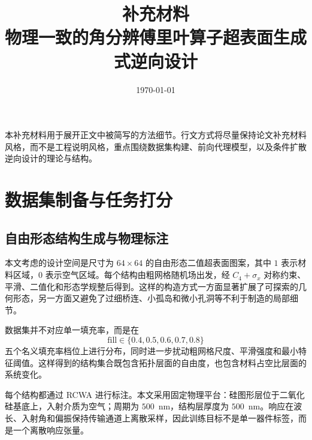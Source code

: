 \documentclass[10pt,a4paper]{article}
\begin{document}
\title{补充材料\\[0.4em]\large 物理一致的角分辨傅里叶算子超表面生成式逆向设计}
\author{}
\date{\today}
\maketitle

本补充材料用于展开正文中被简写的方法细节。行文方式将尽量保持论文补充材料风格，而不是工程说明风格，重点围绕数据集构建、前向代理模型，以及条件扩散逆向设计的理论与结构。

\section{数据集制备与任务打分}

\subsection{自由形态结构生成与物理标注}

本文考虑的设计空间是尺寸为 $64\times64$ 的自由形态二值超表面图案，其中 $1$ 表示材料区域，$0$ 表示空气区域。每个结构由粗网格随机场出发，经 $C_4+\sigma_x$ 对称约束、平滑、二值化和形态学规整后得到。这样的构造方式一方面显著扩展了可探索的几何形态，另一方面又避免了过细桥连、小孤岛和微小孔洞等不利于制造的局部细节。

数据集并不对应单一填充率，而是在
\begin{equation}
\mathrm{fill}\in\{0.4,0.5,0.6,0.7,0.8\}
\end{equation}
五个名义填充率档位上进行分布，同时进一步扰动粗网格尺度、平滑强度和最小特征阈值。这样得到的结构集合既包含拓扑层面的自由度，也包含材料占空比层面的系统变化。

每个结构都通过 RCWA 进行标注。本文采用固定物理平台：硅图形层位于二氧化硅基底上，入射介质为空气；周期为 $500$~nm，结构层厚度为 $500$~nm。响应在波长、入射角和偏振保持传输通道上离散采样，因此训练目标不是单一器件标签，而是一个离散响应张量。
\end{document}
